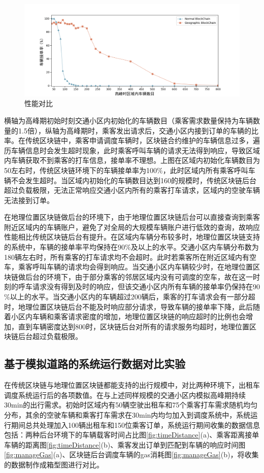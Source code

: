 \begin{figure}[h]
  \centering
  \includegraphics[width=1.0\textwidth]{figures/性能对比}
  \caption{性能对比}\label{fig:compare}
\end{figure}

横轴为高峰期初始时刻交通小区内初始化的车辆数目（乘客需求数量保持为车辆数量的1.5倍），纵轴为高峰期时，乘客发出请求后，交通小区内接到订单的车辆的比率。在传统区块链中，乘客申请调度车辆时，区块链合约维护的车辆信息过多，遍历车辆信息时会发生超时现象，此时乘客呼叫车辆的请求无法得到响应，导致区域内车辆获取不到乘客的打车信息，接单率不理想。上图在区域内初始化车辆数目为50左右时，传统区块链环境下的车辆接单率为100$\%$，此时区域内所有乘客呼叫车辆不会发生超时。当区域内初始化的车辆数目达到160的规模时，传统区块链后台超过负载极限，无法正常响应交通小区内所有的乘客打车请求，区域内的空驶车辆无法接到订单。

​在地理位置区块链做后台的环境下，由于地理位置区块链后台可以直接查询到乘客附近区域内的车辆账户，避免了对全局的大规模车辆账户进行低效的查询，故响应性能相比传统区块链后台有提升。在区域内车辆分布较多时，地理位置区块链支持的系统中，车辆的接单率平均保持在90$\%$及以上的水平。交通小区内车辆分布数为180辆左右时，所有乘客的打车请求均不会超时。此时若乘客所在附近区域内有空车，乘客呼叫车辆的请求均会得到响应。当交通小区内车辆较少时，在地理位置区块链做后台的环境下，由于部分乘客的邻居区域内没有可调度的空车，故在这一时刻的呼车请求没有得到及时的响应，但该交通小区内所有车辆的接单率仍保持在90$\%$以上的水平。当交通小区内的车辆超过200辆后，乘客的打车请求会有一部分超时，地理位置区块链后台不能及时响应部分请求，导致车辆的接单率下降，此后随着小区内车辆和乘客请求密度的增加，地理位置区块链的响应超时的比例也会增加，直到车辆密度达到800时，区块链后台对所有的请求服务均超时，地理位置区块链后台超过负载极限。

\subsection{基于模拟道路的系统运行数据对比实验}
在传统区块链与地理位置区块链都能支持的出行规模中，对比两种环境下，出租车调度系统运行后的各项数值。在与上述同样规模的交通小区内模拟高峰期持续30min的出行需求。初始时区域内有50辆空驶出租车和75个乘客打车需求随机均匀分布，其余的空驶车辆和乘客打车需求在30min内均匀加入到调度系统中，系统运行期间总共处理加入100辆出租车和150位乘客订单，系统运行期间收集的数据信息包括：两种后台环境下的车辆载客时间占比图\ref{fig:timeDistance}(a)、乘客距离接单车辆的距离图\ref{fig:timeDistance}(b)、乘客发出订单到匹配到车辆的响应时间图\ref{fig:manageGas}(a)、区块链后台调度车辆的gas消耗图\ref{fig:manageGas}(b)，将收集的数据制作成箱型图进行对比。

